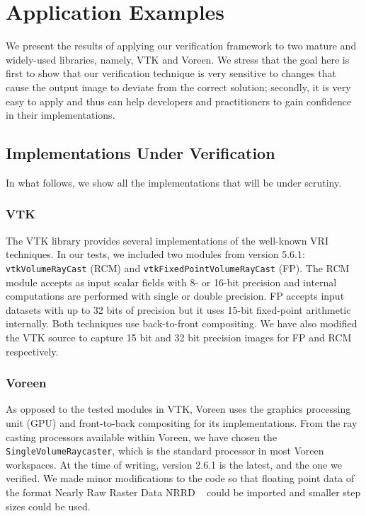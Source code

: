 \section{Application Examples}
\label{chap5:sec:results}

We present the results of applying our verification framework to two
mature and widely-used libraries, namely, VTK and Voreen. We stress
that the goal here is first to show that our verification technique is
very sensitive to changes that cause the output image to deviate from
the correct solution; secondly, it is very easy to apply and thus can
help developers and practitioners to gain confidence in their
implementations.

\subsection{Implementations Under Verification}

In what follows, we show all the implementations that will be under scrutiny.

\subsubsection{VTK} 
The VTK library provides several implementations of the well-known VRI techniques. In our tests, we included two modules from
version 5.6.1: \texttt{vtkVolumeRayCast} (RCM) and
\texttt{vtkFixedPointVolumeRayCast} (FP).  The RCM module
accepts as input scalar fields with 8- or 16-bit precision and internal
computations are performed with single or double precision.  FP
accepts input datasets with up to 32 bits of precision but it uses 15-bit
fixed-point arithmetic internally.  Both techniques use
back-to-front compositing. We have also modified the VTK source to
capture 15 bit and 32 bit precision images for FP and RCM
respectively.


\subsubsection{Voreen} 
As opposed to the tested modules in VTK, Voreen uses the graphics
processing unit (GPU) and front-to-back compositing for its
implementations. From the ray casting processors available within
Voreen, we have chosen the \texttt{SingleVolumeRaycaster}, which is
the standard processor in most Voreen workspaces. At the time of
writing, version 2.6.1 is the latest, and the one we verified. We made
minor modifications to the code so that floating point data of the
format Nearly Raw Raster Data NRRD ~\cite{teem} could be imported and
smaller step sizes could be used.

